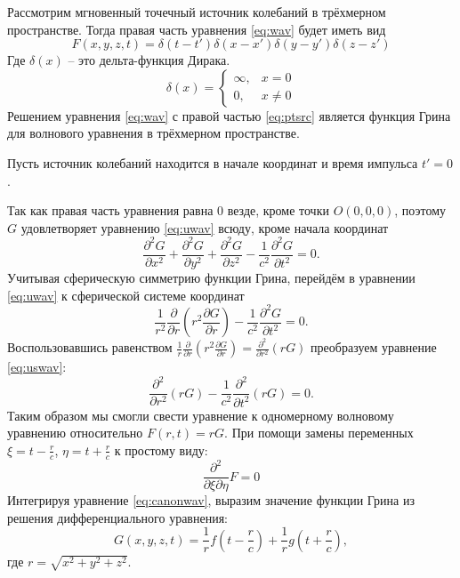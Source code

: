 \documentclass[a4paper, fontsize=14pt]{article}
\begin{document}
	Рассмотрим мгновенный точечный источник колебаний в трёхмерном пространстве.
	Тогда правая часть уравнения \ref{eq:wav} будет иметь вид \cite{zhdanov1988}
	\begin{equation}
		F(x,y,z,t) = \delta(t-t')\delta(x-x')\delta(y-y')\delta(z-z')
		\label{eq:ptsrc}
	\end{equation}
	Где $\delta(x)$ -- это дельта-функция Дирака.
	\begin{equation}
		\delta(x)=\begin{cases}
			\infty,&x=0\\
			0,&x\neq 0
		\end{cases}
		\label{eq:deltadef}
	\end{equation}	
	Решением уравнения \ref{eq:wav} с правой частью \ref{eq:ptsrc} является функция
	Грина для волнового уравнения в трёхмерном пространстве.
	
	Пусть источник колебаний находится в начале координат и время импульса $t' = 0$. 
	
	Так как правая часть уравнения равна 0 везде, кроме точки $O(0,0,0)$, поэтому 
	$G$ удовлетворяет уравнению \ref{eq:uwav} всюду, кроме начала координат
	\begin{equation}
		\frac{\partial^2 G}{\partial x^2} + \frac{\partial^2 G}{\partial y^2} +
		\frac{\partial^2 G}{\partial z^2} - \frac{1}{c^2} \frac{\partial^2 G}{\partial
			t^2} = 0.
		\label{eq:uwav}
	\end{equation}
	Учитывая сферическую симметрию функции Грина, перейдём в уравнении \ref{eq:uwav} к сферической системе координат
	\begin{equation}
		\frac{1}{r^2}\frac{\partial}{\partial r}\left( r^2 \frac{\partial G}{\partial r} \right)- \frac{1}{c^2} \frac{\partial^2 G}{\partial
			t^2} = 0.
		\label{eq:uswav}
	\end{equation}
	Воспользовавшись равенством $\frac{1}{r}\frac{\partial}{\partial r}\left(r^2\frac{\partial G}{\partial r}\right) = \frac{\partial^2}{\partial r^2}\left(rG\right)$ преобразуем уравнение \ref{eq:uswav}:
	\begin{equation}
		\frac{\partial^2}{\partial r^2}\left( r  G\right)- \frac{1}{c^2} \frac{\partial^2 }{\partial
			t^2}\left(r G\right) = 0.
		\label{eq:uswav2}
	\end{equation}
	Таким образом мы смогли свести уравнение к одномерному волновому уравнению относительно $F(r,t) = rG$. При помощи замены переменных $\xi = t - \frac{r}{c}$, $\eta = t+\frac{r}{c}$ к простому виду:
	\begin{equation}
		\frac{\partial^2}{\partial \xi \partial \eta} F = 0	
		\label{eq:canonwav}
	\end{equation}
	Интегрируя уравнение \ref{eq:canonwav}, выразим значение функции Грина из решения дифференциального уравнения:
	\begin{equation}
		G(x,y,z,t) = \frac{1}{r}f\left(t-\frac{r}{c}\right) + \frac{1}{r} g\left(t+\frac{r}{c}\right),
		\label{eq:canonsol}
	\end{equation}
где $r = \sqrt{x^2+y^2+z^2}$.
\end{document}
